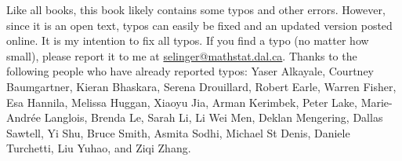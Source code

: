 Like all books, this book likely contains some typos and other
errors. However, since it is an open text, typos can easily be fixed
and an updated version posted online. It is my intention to fix all
typos. If you find a typo (no matter how small), please report it to
me at
\href{mailto:selinger@mathstat.dal.ca}{selinger@mathstat.dal.ca}. Thanks
to the following people who have already reported typos: Yaser
Alkayale, Courtney Baumgartner, Kieran Bhaskara, Serena Drouillard,
Robert Earle, Warren Fisher, Esa Hannila, Melissa Huggan, Xiaoyu Jia,
Arman Kerimbek, Peter Lake, Marie-Andr\'ee Langlois, Brenda Le, Sarah
Li, Li Wei Men, Deklan Mengering, Dallas Sawtell, Yi Shu, Bruce Smith,
Asmita Sodhi, Michael St Denis, Daniele Turchetti, Liu Yuhao, and Ziqi
Zhang.
